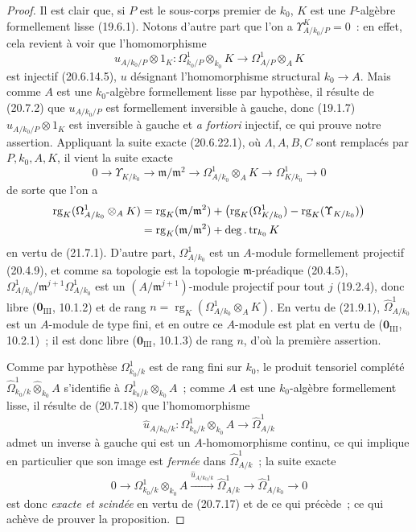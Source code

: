 \begin{proof}
Il est clair que, si $P$ est le sous-corps premier de $k_0$, $K$ est une
$P$-algèbre formellement lisse (19.6.1). Notons d'autre part que l'on a
$\Upsilon^K_{A/k_0/P}=0$~: en effet, cela revient à voir que l'homomorphisme
\[
  u_{A/k_0/P}\otimes1_K:
  \Omega^1_{k_0/P}\otimes_{k_0}K
  \longrightarrow \Omega^1_{A/P}\otimes_A K
\]
est injectif (20.6.14.5), $u$ désignant l'homomorphisme structural
$k_0\to A$. Mais comme $A$ est une $k_0$-algèbre formellement lisse par
hypothèse, il résulte de (20.7.2) que $u_{A/k_0/P}$ est formellement
inversible à gauche, donc (19.1.7) $u_{A/k_0/P}\otimes1_K$ est inversible à
gauche et \emph{a fortiori} injectif, ce qui prouve notre assertion.
Appliquant la suite exacte (20.6.22.1), où $\Lambda,A,B,C$ sont remplacés par
$P,k_0,A,K$, il vient la suite exacte
\[
  0\longrightarrow \Upsilon_{K/k_0}
  \longrightarrow \mathfrak m/\mathfrak m^2
  \longrightarrow \Omega^1_{A/k_0}\otimes_A K
  \longrightarrow \Omega^1_{K/k_0}\longrightarrow0
\]
de sorte que l'on a
\[
\begin{split}
  \operatorname{rg}_K(\Omega^1_{A/k_0}\otimes_AK)
  &={\operatorname{rg}}_K(\mathfrak m/\mathfrak m^2)
    +\bigl(\operatorname{rg}_K(\Omega^1_{K/k_0})
    -\operatorname{rg}_K(\Upsilon_{K/k_0})\bigr)\\
  &={\operatorname{rg}}_K(\mathfrak m/\mathfrak m^2)
    +\deg.\operatorname{tr}_{k_0}K
\end{split}
\]
en vertu de (21.7.1). D'autre part, $\Omega^1_{A/k_0}$ est un
$A$-module formellement projectif (20.4.9), et comme sa topologie est la
topologie $\mathfrak m$-préadique (20.4.5),
$\Omega^1_{A/k_0}/\mathfrak m^{j+1}\Omega^1_{A/k_0}$ est un
$(A/\mathfrak m^{j+1})$-module projectif pour tout $j$ (19.2.4), donc libre
($\mathbf 0_{\mathrm{III}}$, 10.1.2) et de rang
$n=\operatorname{rg}_K(\Omega^1_{A/k_0}\otimes_AK)$. En vertu de (21.9.1),
$\widehat\Omega^1_{A/k_0}$ est un $A$-module de type fini, et en outre ce
$A$-module est plat en vertu de ($\mathbf 0_{\mathrm{III}}$, 10.2.1)~; il est
donc libre ($\mathbf 0_{\mathrm{III}}$, 10.1.3) de rang $n$, d'où la première
assertion.

Comme par hypothèse $\Omega^1_{k_0/k}$ est de rang fini sur $k_0$, le produit
tensoriel complété
$\widehat\Omega^1_{k_0/k}\widehat\otimes_{k_0}A$ s'identifie à
$\Omega^1_{k_0/k}\otimes_{k_0}A$~; comme $A$ est une $k_0$-algèbre
formellement lisse, il résulte de (20.7.18) que l'homomorphisme
\[
  \widehat u_{A/k_0/k}:
  \Omega^1_{k_0/k}\otimes_{k_0}A
  \longrightarrow\widehat\Omega^1_{A/k}
\]
admet un inverse à gauche qui est un $A$-homomorphisme continu, ce qui
implique en particulier que son image est \emph{fermée} dans
$\widehat\Omega^1_{A/k}$~; la suite exacte
\[
  0\longrightarrow \Omega^1_{k_0/k}\otimes_{k_0}A
  \xrightarrow{\widehat u_{A/k_0/k}}\widehat\Omega^1_{A/k}
  \longrightarrow\widehat\Omega^1_{A/k_0}\longrightarrow0
\]
est donc \emph{exacte et scindée} en vertu de (20.7.17) et de ce qui précède~; ce
qui achève de prouver la proposition.
\end{proof}

